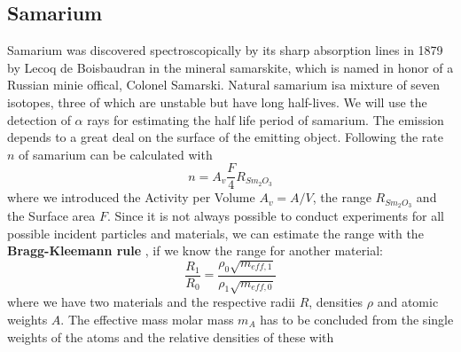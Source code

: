 \subsection{Samarium}
\label{subsec:samarium_theory}
Samarium was discovered spectroscopically by its sharp absorption lines in 1879
by Lecoq de Boisbaudran \cite{haynes}
in the mineral samarskite, which is named in honor of a Russian minie offical, Colonel Samarski.
Natural samarium isa mixture of seven isotopes, three of which are unstable but have long half-lives.
We will use the detection of $\alpha$ rays for estimating the half life period of samarium. 
The emission depends to a great deal on the surface of the emitting object.
Following \cite{ver} the rate $n$ of samarium can be calculated with
\begin{equation}
n = A_v \frac{F}{4} R_{Sm_2O_3}
\label{eq:range2}
\end{equation}
where we introduced the Activity per Volume $A_v = A/V$, the range $R_{Sm_2O_3}$ and the Surface area $F$.
Since it is not always possible to conduct experiments for all possible incident particles and materials, we
can estimate the range with the \textbf{Bragg-Kleemann rule} \cite{knoll2000radiation}, if we know
the range for another material:
\begin{equation}
    \frac{R_1}{R_0} = \frac{\rho_0 \sqrt{m_{eff,1}}}{\rho_1 \sqrt{m_{eff,0}}} 
    \label{eq:range}
\end{equation}
where we have two materials and the respective radii $R$, densities $\rho$ and atomic weights $A$. 
The effective mass molar mass $m_A$ has to be concluded from the single weights of the atoms and the relative densities of these with
